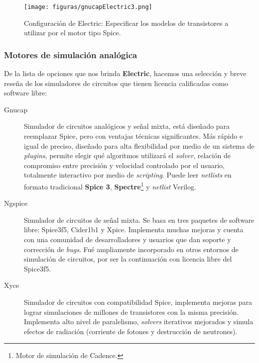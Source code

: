 \begin{figure}
  \centering
\texttt{[image: figuras/gnucapElectric3.png]}
  \caption{Configuración de Electric: Especificar los modelos de transistores a utilizar por el motor tipo Spice.}
\label{fig:gnucapElectric}
\end{figure}



\subsubsection{Motores de simulación analógica}

De la lista de opciones que nos brinda \textbf{Electric}, hacemos una selección y breve reseña de los simuladores de circuitos que tienen licencia calificadas como software libre:


\begin{description}
\item[Gnucap] Simulador de circuitos analógicos y señal mixta, está diseñado para reemplazar Spice, pero con ventajas técnicas significantes. Más rápido e igual de preciso, diseñado para alta flexibilidad por medio de un sistema de \emph{plugins}, permite elegir qué algoritmos utilizará el \emph{solver}, relación de compromiso entre precisión y velocidad controlado por el usuario, totalmente interactivo por medio de \emph{scripting}. Puede leer \emph{netlists} en formato tradicional \textbf{Spice 3}, \textbf{Spectre}\footnote{Motor de simulación de Cadence.} y  \emph{netlist} Verilog.

\item[Ngspice] Simulador de circuitos de señal mixta. Se basa en tres paquetes de software libre: Spice3f5, Cider1b1 y Xpice. Implementa muchas mejoras y cuenta con una comunidad de desarrolladores y usuarios que dan soporte y corrección de \emph{bugs}. Fué ampliamente incorporado en otros entornos de simulación de circuitos, por ser la continuación con licencia libre del Spice3f5.

\item[Xyce] Simulador de circuitos con compatibilidad Spice, implementa mejoras para lograr simulaciones de millones de transistores con la misma precisión. Implementa alto nivel de paralelismo, \emph{solvers} iterativos mejorados y simula efectos de radiación (corriente de fotones y destrucción de neutrones).
\end{description}

